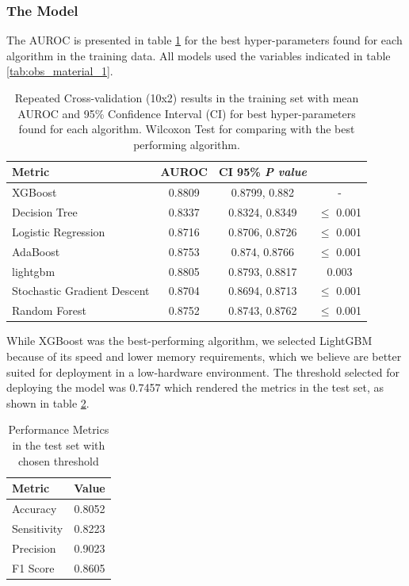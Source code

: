 \subsubsection{The Model}
The AUROC is presented in table \ref{tab:performancemetricsauc} for the best hyper-parameters found for each algorithm in the training data. All models used the variables indicated in table \ref{tab:obs_material_1}.
\begin{table}[htbp]
  \centering
  \caption[Performance Metrics in the training set]{Repeated Cross-validation (10x2) results in the training set with mean AUROC and 95\% Confidence Interval (CI) for best hyper-parameters found for each algorithm. Wilcoxon Test for comparing with the best performing algorithm.}
  \label{tab:performancemetricsauc}
  \renewcommand{\arraystretch}{1.5} %
  \setlength{\tabcolsep}{12pt} %
  \begin{tabular}{lccc}
    \hline
    \textbf{Metric} & \textbf{AUROC} & \textbf{CI 95\%} \textit{\textbf{P value}} \\
    \hline
    XGBoost & 0.8809 & 0.8799, 0.882 & - \\  
    Decision Tree & 0.8337 & 0.8324, 0.8349 & $\leq$ 0.001\\
    Logistic Regression & 0.8716 & 0.8706, 0.8726 & $\leq$ 0.001\\
    AdaBoost & 0.8753 & 0.874, 0.8766 & $\leq$ 0.001\\ 
    lightgbm & 0.8805 & 0.8793, 0.8817 &  0.003\\ 
    Stochastic Gradient Descent & 0.8704 & 0.8694, 0.8713& $\leq$ 0.001\\ 
    Random Forest & 0.8752 & 0.8743, 0.8762& $\leq$ 0.001 \\  
    \hline
  \end{tabular}
\end{table}
While XGBoost was the best-performing algorithm, we selected LightGBM  \cite{lightgbm} because of its speed and lower memory requirements, which we believe are better suited for deployment in a low-hardware environment. The threshold selected for deploying the model was 0.7457 which rendered the metrics in the test set, as shown in table \ref{tab:performancemetricsthreshold}.

\begin{table}[htbp]
  \centering
\caption{Performance Metrics in the test set with chosen threshold}
\label{tab:performancemetricsthreshold}
\renewcommand{\arraystretch}{1.5} %
\setlength{\tabcolsep}{12pt} %
\begin{tabular}{lc}
    \hline
    \textbf{Metric} & \textbf{Value} \\
    \hline
    Accuracy & 0.8052 \\
    Sensitivity & 0.8223 \\
    Precision & 0.9023 \\
    F1 Score & 0.8605 \\
    \hline
  \end{tabular}
\end{table}




